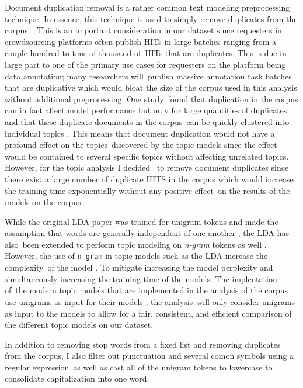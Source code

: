 \documentclass[letterpaper,12pt]{article}
\begin{document}
Document duplication removal is a rather common text modeling preprocessing technique. In essence, this technique is used to simply remove duplicates from the corpus. \
This is an important consideration in our dataset since requesters in crowdsourcing platforms often publish HITs in large batches ranging from a couple hundred to tens of thousand of\
HITs that are duplicates. This is due in large part to one of the primary use cases for requesters on the platform being data annotation; many researchers will\
publish massive annotation task batches that are duplicative which would bloat the size of the corpus used in this analysis without additional preprocessing. One study\
found that duplication in the corpus can in fact affect model performance but only for large quantities of duplicates and that these duplicate documents in the corpus\
can be quickly clustered into individual topics \cite{schofieldunderstanding}. This means that document duplication would not have a profound effect on the topics\
discovered by the topic models since the effect would be contained to several specific topics without affecting unrelated topics. However, for the topic analysis I decided \
to remove document duplicates since there exist a large number of duplicate HITS in the corpus which would increase the training time exponentially without any positive effect\
on the results of the models on the corpus.

While the original LDA paper was trained for unigram tokens and made the assumption that words are generally independent of one another \cite{blei2003latent}, the LDA has also\
been extended to perform topic modeling on \emph{n-gram} tokens as well \cite{wang2005note}. However, the use of \texttt{n-gram} in topic models such as the LDA increase the complexity\
of the model \cite{wang2007topical}. To mitigate increasing the model perplexity and simultaneously increasing the training time of the models. The implentation of\
the modern topic models that are implemented in the analysis of the corpus use unigrams as input for their models \cite{moody2016mixing}\cite{dieng2019topic}, the analysis\
will only consider unigrams as input to the models to allow for a fair, consistent, and efficient comparison of the different topic models on our dataset.

In addition to removing stop words from a fixed list and removing duplicates from the corpus, I also filter out punctuation and several comon symbols using a regular expression\
as well as cast all of the unigram tokens to lowercase to consolidate capitalization into one word.
\end{document}
